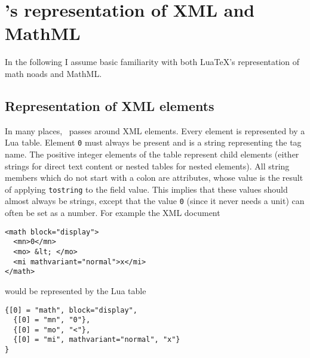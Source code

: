 \newcommand\Luamml{\pkg{Luamml}}
\newcommand\luamml{\pkg{luamml}}
\newcommand\xmltag[1]{\texttt{<#1>}}
\section{\Luamml's representation of XML and MathML}
In the following I assume basic familiarity with both Lua\TeX's representation of math noads and MathML.

\subsection{Representation of XML elements}
In many places, \luamml\ passes around XML elements. Every element is represented by a Lua table.
Element \texttt 0 must always be present and is a string representing the tag name.
The positive integer elements of the table represent child elements (either strings for direct text content or nested tables for nested elements).
All string members which do not start with a colon are attributes, whose value is the result of applying \texttt{tostring} to the field value.
This implies that these values should almost always be strings, except that the value \texttt 0 (since it never needs a unit) can often be set as a number.
For example the XML document
\begin{verbatim}
<math block="display">
  <mn>0</mn>
  <mo> &lt; </mo>
  <mi mathvariant="normal">x</mi>
</math>
\end{verbatim}
would be represented by the Lua table
\begin{verbatim}
{[0] = "math", block="display",
  {[0] = "mn", "0"},
  {[0] = "mo", "<"},
  {[0] = "mi", mathvariant="normal", "x"}
}
\end{verbatim}

